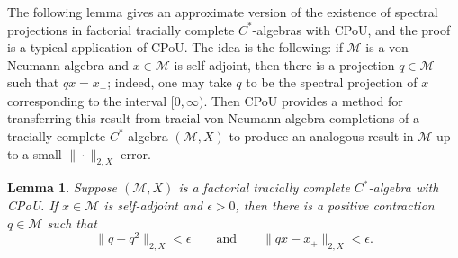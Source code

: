 \documentclass[a4paper,11pt]{amsart}
\newtheorem{lemma}[theorem]{Lemma}
\theoremstyle{definition}
\numberwithin{equation}{section}
\numberwithin{theorem}{section}
\newcommand{\M}{\mathcal{M}}
\begin{document}
The following lemma gives an approximate version of the existence of spectral projections in factorial tracially complete $C^*$-algebras with CPoU, and the proof is a typical application of CPoU.  The idea is the following: if $\M$ is a von Neumann algebra and $x \in \M$ is self-adjoint, then there is a projection $q \in \M$ such that $qx = x_+$; indeed, one may take $q$ to be the spectral projection of $x$ corresponding to the interval $[0, \infty)$. Then CPoU provides a method for transferring this result from tracial von Neumann algebra completions of a tracially complete $C^*$-algebra $(\M, X)$ to produce an analogous result in $\M$ up to a small $\|\cdot\|_{2, X}$-error.

\begin{lemma}\label{lem:approx-spectral-proj}
	Suppose $(\M, X)$ is a factorial tracially complete $C^*$-algebra with CPoU.  If $x \in \M$ is self-adjoint and $\epsilon > 0$, then there is a positive contraction $q \in \M$ such that
	\begin{equation}
		\|q - q^2\|_{2, X} < \epsilon \qquad \text{and} \qquad \|qx - x_+\|_{2, X} < \epsilon.
	\end{equation}
\end{lemma}
\end{document}
